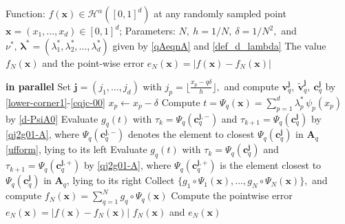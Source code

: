 \documentclass[10pt,reqno,final]{amsart}
\theoremstyle{remark}
\theoremstyle{definition}
\newcommand{\bs}[1]{\boldsymbol{#1}}
\begin{document}
\begin{algorithm}[htbp]
\caption{\bf Algorithm for computing $f_N(\bs x)$ and $e_N(\bs x)=|f(\bs x)-f_N(\bs x)|$}
\label{alg:empirical_Linf_fN}
\begin{algorithmic}[1]
\Require  Function:
$f(\bs x)\in {\mathcal H}^\alpha([0,1]^d)$ 
at any randomly sampled  point $\bs x=(x_1,\dots,x_d)\in[0,1]^d$;  
Parameters:
$N,~h=1/N,~\delta=1/N^2,$ and $\nu^\ast,\,
\boldsymbol{\lambda}^\ast=(\lambda_1^\ast,\lambda_2^\ast,\dots,\lambda_d^\ast)
$ given by
\eqref{qAeqnA} and \eqref{def_d_lambda} 
\smallskip
\Ensure The value
   $f_N(\bs x)$ and the point-wise error $e_N(\bs x)=|f(\bs x)-f_N(\bs x)|$
\smallskip

 \textbf{in parallel}  \smallskip
    \State Set $\boldsymbol{j}=(j_1,\dots,j_d)$ with $j_p=\big\lfloor \frac{x_p-q\delta}{h}\big\rfloor,$ and compute  $\bs{v}_q^{\bs j},~\tilde{\bs{v}}_q^{\bs j},~\bs{c}_q^{\bs j}$ by \eqref{lower-corner1}-\eqref{cqjc-00}
    \smallskip
            \State $x_p\leftarrow x_p-\delta$
        \EndIf
    \EndFor
    \smallskip
        \State Compute $t=\Psi_q(\bs x)=\sum_{p=1}^d \lambda_p^\ast\,\psi_p(x_p)$ by \eqref{d-PsiA0}
        \smallskip
        \If{$\Psi_q(\bs x)\le\Psi_q(\bs{c}_q^{\bs j})$} 
        \smallskip
            \State Evaluate $g_q(t)$ with $\tau_k=\Psi_q(\bs{c}_q^{\bs j,\mathrm{-}})$ and $\tau_{k+1}=\Psi_q(\bs{c}_q^{\bs j})$
        by \eqref{qj2g01-A}, where 
        \hspace*{1cm} $\Psi_q(\bs{c}_q^{\bs j,\mathrm{-}})$ denotes the element to closest  $\Psi_q(\bs{c}_q^{\bs j})$ in  $\bs A_q$ \eqref{ufform}, lying to its left
        \Else
        \smallskip
            \State Evaluate $g_q(t)$ with $\tau_{k}=\Psi_q(\bs{c}_q^{\bs j})$ and $\tau_{k+1}=\Psi_q(\bs{c}_q^{\bs j,\mathrm{+}})$
        by \eqref{qj2g01-A}, where \hspace*{1cm} $\Psi_q(\bs{c}_q^{\bs j,\mathrm{+}})$ is the  element closest to $\Psi_q(\bs{c}_q^{\bs j})$ in $\bs A_q$, lying to its right     
        \EndIf
        \smallskip
\EndFor
\smallskip
\State Collect $\{g_1\circ \Psi_1(\bs x), \ldots, g_N\circ \Psi_N(\bs x)\},$  and 
compute $f_N(\bs x)=\sum_{q=1}^Ng_q\circ\Psi_q(\bs x)$
\smallskip
\State Compute the pointwise error $e_N(\bs x)=|f(\bs x)-f_N(\bs x)|$
\smallskip
\State 
\smallskip 
\Return $f_N(\bs x)$ and $e_N(\bs x)$
\end{algorithmic}
\end{algorithm}
\end{document}
